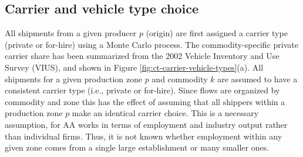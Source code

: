 \subsection{Carrier and vehicle type choice}

All shipments from a given producer $p$ (origin) are first assigned a carrier type (private or for-hire) using a Monte Carlo process. The commodity-specific private carrier share has been summarized from the 2002 Vehicle Inventory and Use Survey (VIUS), and shown in Figure \ref{fig:ct-carrier-vehicle-types}(a). All shipments for a given production zone $p$ and commodity $k$ are assumed to have a consistent carrier type (i.e., private or for-hire). Since flows are organized by commodity and zone this has the effect of assuming that all shippers within a production zone $p$ make an identical carrier choice. This is a necessary assumption, for AA works in terms of employment and industry output rather than individual firms. Thus, it is not known whether employment within any given zone comes from a single large establishment or many smaller ones.

